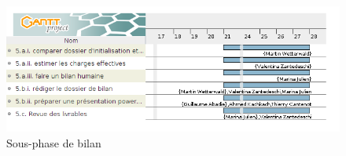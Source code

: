 \begin{figure}[h]
    \centering
    \includegraphics[scale=0.65]{./images/SPIE_5.png}
    \caption{Sous-phase de bilan}
    \label{diagram:si_map}
\end{figure}
